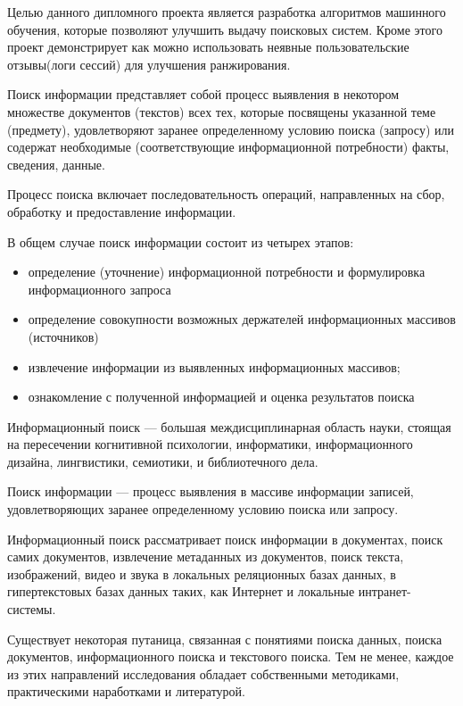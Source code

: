 
Целью данного дипломного проекта является разработка алгоритмов машинного обучения, которые позволяют улучшить выдачу поисковых систем. Кроме этого проект демонстрирует как можно использовать неявные пользовательские отзывы(логи сессий) для улучшения ранжирования. 

Поиск информации представляет собой процесс выявления в некотором множестве документов (текстов) всех тех, которые посвящены указанной теме (предмету), удовлетворяют заранее определенному условию поиска (запросу) или содержат необходимые (соответствующие информационной потребности) факты, сведения, данные.

Процесс поиска включает последовательность операций, направленных на сбор, обработку и предоставление информации.

В общем случае поиск информации состоит из четырех этапов:

\begin{itemize}
	\item определение (уточнение) информационной потребности и формулировка информационного запроса
	\item определение совокупности возможных держателей информационных массивов (источников)
	\item извлечение информации из выявленных информационных массивов;
	\item ознакомление с полученной информацией и оценка результатов поиска
\end{itemize}

Информационный поиск — большая междисциплинарная область науки, стоящая на пересечении когнитивной психологии, информатики, информационного дизайна, лингвистики, семиотики, и библиотечного дела.

Поиск информации — процесс выявления в массиве информации записей, удовлетворяющих заранее определенному условию поиска или запросу.

Информационный поиск рассматривает поиск информации в документах, поиск самих документов, извлечение метаданных из документов, поиск текста, изображений, видео и звука в локальных реляционных базах данных, в гипертекстовых базах данных таких, как Интернет и локальные интранет-системы.

Существует некоторая путаница, связанная с понятиями поиска данных, поиска документов, информационного поиска и текстового поиска. Тем не менее, каждое из этих направлений исследования обладает собственными методиками, практическими наработками и литературой.

